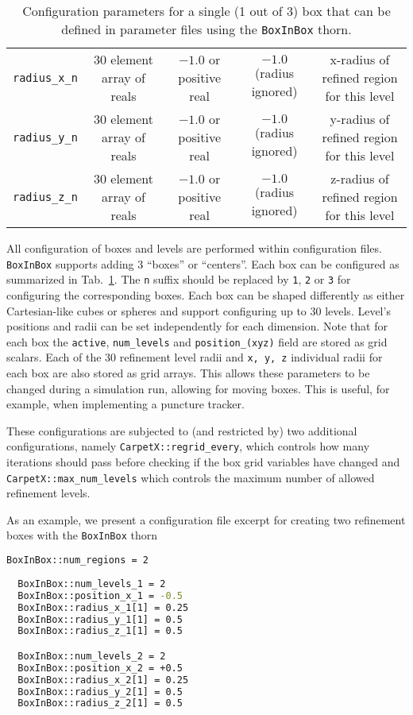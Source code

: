 \begin{table}[]
{\begin{tabular}{ccccc}
    \texttt{radius\_x\_n}   & 30 element array of reals & $-1.0$ or positive real                                           & $-1.0$ (radius ignored)         & x-radius of refined region for this level \\
    \texttt{radius\_y\_n}   & 30 element array of reals & $-1.0$ or positive real                                           & $-1.0$ (radius ignored)         & y-radius of refined region for this level \\
    \texttt{radius\_z\_n}   & 30 element array of reals & $-1.0$ or positive real                                           & $-1.0$ (radius ignored)         & z-radius of refined region for this level \\\hline\hline
  \end{tabular}%
  }
  \caption{Configuration parameters for a single (1 out of 3) box that can be defined in parameter files using the \texttt{BoxInBox} thorn.}
  \label{tab:box_config}
\end{table}

All configuration of boxes and levels are performed within configuration files. \texttt{BoxInBox} supports adding 3 ``boxes'' or ``centers''. Each box can be configured as summarized in Tab.~\ref{tab:box_config}. The \texttt{n} suffix should be replaced by \texttt{1}, \texttt{2} or \texttt{3} for configuring the corresponding boxes. Each box can be shaped differently as either Cartesian-like cubes or spheres and support configuring up to 30 levels. Level's positions and radii can be set independently for each dimension. Note that for each box the \texttt{active}, \texttt{num\_levels} and \texttt{position\_(xyz)} field are stored as grid scalars. Each of the 30 refinement level radii and \texttt{x, y, z} individual radii for each box are also stored as grid arrays. This allows these parameters to be changed during a simulation run, allowing for moving boxes. This is useful, for example, when implementing a puncture tracker. 

These configurations are subjected to (and restricted by) two additional \CarpetX\space configurations, namely \texttt{CarpetX::regrid\_every}, which controls how many iterations should pass before checking if the box grid variables have changed and \texttt{CarpetX::max\_num\_levels} which controls the maximum number of allowed refinement levels.

As an example, we present a configuration file excerpt for creating two refinement boxes with the \texttt{BoxInBox} thorn

\begin{lstlisting}[language=bash]
  BoxInBox::num_regions = 2
  
  BoxInBox::num_levels_1 = 2
  BoxInBox::position_x_1 = -0.5
  BoxInBox::radius_x_1[1] = 0.25
  BoxInBox::radius_y_1[1] = 0.5
  BoxInBox::radius_z_1[1] = 0.5

  BoxInBox::num_levels_2 = 2
  BoxInBox::position_x_2 = +0.5
  BoxInBox::radius_x_2[1] = 0.25
  BoxInBox::radius_y_2[1] = 0.5
  BoxInBox::radius_z_2[1] = 0.5
\end{lstlisting}

